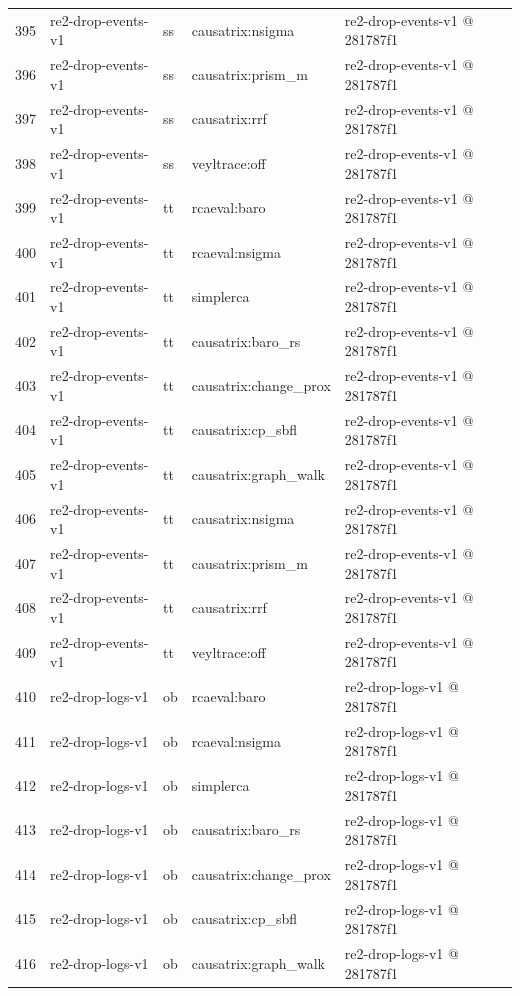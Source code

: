 \begin{longtable}{@{}r>{\raggedright\arraybackslash}p{87.0pt}>{\raggedright\arraybackslash}p{18.0pt}>{\raggedright\arraybackslash}p{63.0pt}>{\raggedright\arraybackslash}p{108.0pt}@{}}
395 & re2-drop-events-v1 & ss & causatrix:nsigma & re2-drop-events-v1 @ 281787f1 \\
396 & re2-drop-events-v1 & ss & causatrix:prism\_m & re2-drop-events-v1 @ 281787f1 \\
397 & re2-drop-events-v1 & ss & causatrix:rrf & re2-drop-events-v1 @ 281787f1 \\
398 & re2-drop-events-v1 & ss & veyltrace:off & re2-drop-events-v1 @ 281787f1 \\
399 & re2-drop-events-v1 & tt & rcaeval:baro & re2-drop-events-v1 @ 281787f1 \\
400 & re2-drop-events-v1 & tt & rcaeval:nsigma & re2-drop-events-v1 @ 281787f1 \\
401 & re2-drop-events-v1 & tt & simplerca & re2-drop-events-v1 @ 281787f1 \\
402 & re2-drop-events-v1 & tt & causatrix:baro\_rs & re2-drop-events-v1 @ 281787f1 \\
403 & re2-drop-events-v1 & tt & causatrix:change\_prox & re2-drop-events-v1 @ 281787f1 \\
404 & re2-drop-events-v1 & tt & causatrix:cp\_sbfl & re2-drop-events-v1 @ 281787f1 \\
405 & re2-drop-events-v1 & tt & causatrix:graph\_walk & re2-drop-events-v1 @ 281787f1 \\
406 & re2-drop-events-v1 & tt & causatrix:nsigma & re2-drop-events-v1 @ 281787f1 \\
407 & re2-drop-events-v1 & tt & causatrix:prism\_m & re2-drop-events-v1 @ 281787f1 \\
408 & re2-drop-events-v1 & tt & causatrix:rrf & re2-drop-events-v1 @ 281787f1 \\
409 & re2-drop-events-v1 & tt & veyltrace:off & re2-drop-events-v1 @ 281787f1 \\
410 & re2-drop-logs-v1 & ob & rcaeval:baro & re2-drop-logs-v1 @ 281787f1 \\
411 & re2-drop-logs-v1 & ob & rcaeval:nsigma & re2-drop-logs-v1 @ 281787f1 \\
412 & re2-drop-logs-v1 & ob & simplerca & re2-drop-logs-v1 @ 281787f1 \\
413 & re2-drop-logs-v1 & ob & causatrix:baro\_rs & re2-drop-logs-v1 @ 281787f1 \\
414 & re2-drop-logs-v1 & ob & causatrix:change\_prox & re2-drop-logs-v1 @ 281787f1 \\
415 & re2-drop-logs-v1 & ob & causatrix:cp\_sbfl & re2-drop-logs-v1 @ 281787f1 \\
416 & re2-drop-logs-v1 & ob & causatrix:graph\_walk & re2-drop-logs-v1 @ 281787f1 \\

\end{longtable}
